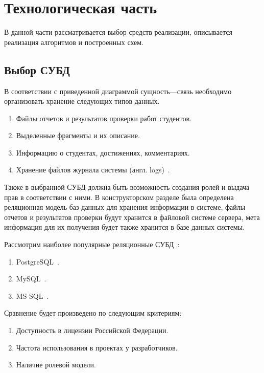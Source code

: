 \chapter{Технологическая часть}
В данной части рассматривается выбор средств реализации, описывается реализация
алгоритмов и построенных схем.

\section{Выбор СУБД}
В соответствии с приведенной диаграммой сущность---связь необходимо организовать
хранение следующих типов данных.
\begin{enumerate}
	\item Файлы отчетов и результатов проверки работ студентов.
	\item Выделенные фрагменты и их описание.
	\item Информацию о студентах, достижениях, комментариях.
	\item Хранение файлов журнала системы (англ. logs)~\cite{kuznecov-db}.
\end{enumerate}
Также в выбранной СУБД должна быть возможность создания ролей и выдача прав в
соответствии с ними.
В конструкторском разделе была определена реляционная модель баз данных для
хранения информации в системе, файлы отчетов и результатов проверки будут
хранится в файловой системе сервера, мета информация для их получения будет
также хранится в базе данных системы.

Рассмотрим наиболее популярные реляционные СУБД~\cite{sql_popular}:
\begin{enumerate}
	\item PostgreSQL~\cite{postgres,postgres_pro_cert}.
	\item MySQL~\cite{ms_sql_server}.
	\item MS SQL~\cite{mysql}.
\end{enumerate}

Сравнение будет произведено по следующим критериям:
\begin{enumerate}
	\item Доступность в лицензии Российской Федерации.
	\item Частота использования в проектах у разработчиков.
	\item Наличие ролевой модели.
\end{enumerate}


